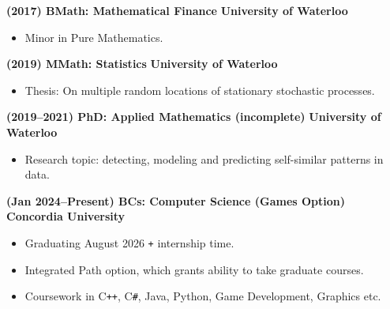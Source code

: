 \documentclass[11pt, oneside]{article}   	%
\begin{document}
\small

\vspace{4pt}

\textbf{(2017) BMath: Mathematical Finance} \hfill \textbf{University of Waterloo}

\vspace{-6.5pt}
\begin{itemize}
\item Minor in Pure Mathematics.
\end{itemize}

\vspace{-4pt}

\textbf{(2019) MMath: Statistics} \hfill \textbf{University of Waterloo}

\vspace{-6pt}
\begin{itemize}
\item Thesis: On multiple random locations of stationary stochastic processes.
\end{itemize}

\vspace{-4pt}

\textbf{(2019--2021) PhD: Applied Mathematics (incomplete)} \hfill \textbf{University of Waterloo}

\vspace{-6pt}
\begin{itemize}
\item Research topic: detecting, modeling and predicting self-similar patterns in data.
\end{itemize}

\vspace{-4pt}

\textbf{(Jan 2024--Present) BCs: Computer Science (Games Option)} \hfill \textbf{Concordia University}

\vspace{-6pt}
\begin{itemize}
\item Graduating August 2026 \texttt{+} internship time.
\vspace{-4pt}
\item Integrated Path option, which grants ability to take graduate courses.
\vspace{-4pt}
\item Coursework in C\texttt{++}, C\texttt{\#}, Java, Python, Game Development, Graphics etc.
\end{itemize}

\vspace{6pt}
\end{document}
